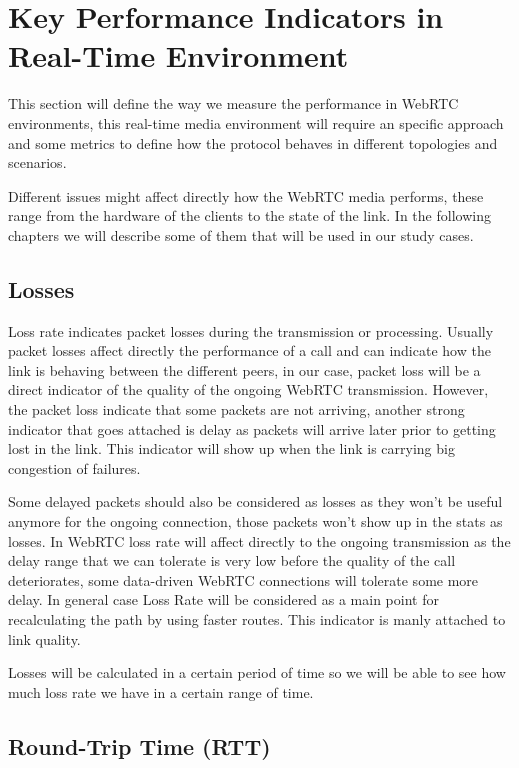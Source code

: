 \section{Key Performance Indicators in Real-Time Environment}


\thispagestyle{empty}

This section will define the way we measure the performance in WebRTC environments, this real-time media environment will require an specific approach and some metrics to define how the protocol behaves in different topologies and scenarios. 

Different issues might affect directly how the WebRTC media performs, these range from the hardware of the clients to the state of the link. In the following chapters we will describe some of them that will be used in our study cases.

\subsection{Losses}

Loss rate indicates packet losses during the transmission or processing. Usually packet losses affect directly the performance of a call and can indicate how the link is behaving between the different peers, in our case, packet loss will be a direct indicator of the quality of the ongoing WebRTC transmission. However, the packet loss indicate that some packets are not arriving, another strong indicator that goes attached is delay as packets will arrive later prior to getting lost in the link. This indicator will show up when the link is carrying big congestion of failures. 

Some delayed packets should also be considered as losses as they won't be useful anymore for the ongoing connection, those packets won't show up in the stats as losses. In WebRTC loss rate will affect directly to the ongoing transmission as the delay range that we can tolerate is very low before the quality of the call deteriorates, some data-driven WebRTC connections will tolerate some more delay. In general case Loss Rate will be considered as a main point for recalculating the path by using faster routes. This indicator is manly attached to link quality.

Losses will be calculated in a certain period of time so we will be able to see how much loss rate we have in a certain range of time.

\subsection{Round-Trip Time (RTT)}

